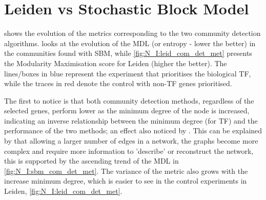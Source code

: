 \section{Leiden vs Stochastic Block Model} \label{s:N_I:sel_tf_com_det}

 shows the evolution of the metrics corresponding to the two community detection algorithms.  looks at the evolution of the MDL (or entropy - lower the better) in the communities found with SBM, while \cref{fig:N_I:leid_com_det_met} presents the Modularity Maximisation score for Leiden (higher the better). The lines/boxes in blue represent the experiment that prioritises the biological TF, while the traces in red denote the control with non-TF genes prioritised. 

The first to notice is that both community detection methods, regardless of the selected genes, perform lower as the minimum degree of the node is increased, indicating an inverse relationship between the minimum degree (for TF) and the performance of the two methods; an effect also noticed by \citet{Care2019-ij}. This can be explained by that allowing a larger number of edges in a network, the graphs become more complex and require more information to 'describe' or reconstruct the network, this is supported by the ascending trend of the MDL in \cref{fig:N_I:sbm_com_det_met}. The variance of the metric also grows with the increase minimum degree, which is easier to see in the control experiments in Leiden, \cref{fig:N_I:leid_com_det_met}.

